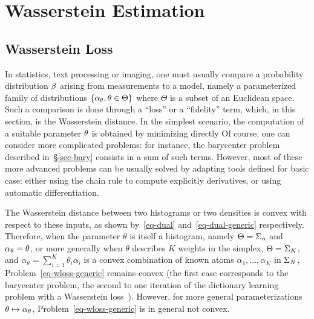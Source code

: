 

\section{Wasserstein Estimation}


\subsection{Wasserstein Loss}

In statistics, text processing or imaging, one must usually compare a probability distribution $\beta$ arising from measurements to a model, namely a parameterized family of distributions $\{\alpha_\theta,\theta\in\Theta\}$ where $\Theta$ is a subset of an Euclidean space. Such a comparison is done through a ``loss'' or a ``fidelity'' term, which, in this section, is the Wasserstein distance. 
%
In the simplest scenario, the computation of a suitable parameter $\theta$ is obtained by minimizing directly
Of course, one can consider more complicated problems: for instance, the barycenter problem described in~\S\ref{sec-bary} consists in a sum of such terms. However, most of these more advanced problems can be usually solved by adapting tools defined for basic case: either using the chain rule to compute explicitly derivatives, or using automatic differentiation. %

The Wasserstein distance between two histograms or two densities is convex with respect to these inputs, as shown by~\eqref{eq-dual} and~\eqref{eq-dual-generic} respectively. Therefore, when the parameter $\theta$ is itself a histogram, namely $\Theta=\Sigma_n$ and $\alpha_\theta=\theta$, or more generally when $\theta$ describes $K$ weights in the simplex, $\Theta=\Sigma_K$, and $\alpha_\theta=\sum_{i=1}^K \theta_i \alpha_i$ is a convex combination of known atoms $\alpha_1,\dots,\alpha_K$ in $\Sigma_N$, Problem~\eqref{eq-wloss-generic} remains convex (the first case corresponds to the barycenter problem, the second to one iteration of the dictionary learning problem with a Wasserstein loss~\cite{pmlr-v51-rolet16}). However, for more general parameterizations $\theta\mapsto \alpha_\theta$, Problem~\eqref{eq-wloss-generic} is in general not convex. 


